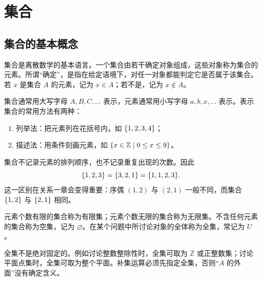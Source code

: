 %
%

\chapter{集合}

\section{集合的基本概念}

集合是离散数学的基本语言。一个集合由若干确定对象组成，这些对象称为集合的元素。所谓“确定”，是指在给定语境下，对任一对象都能判定它是否属于该集合。若 $x$ 是集合 $A$ 的元素，记为 $x\in A$；若不是，记为 $x\notin A$。

\begin{definition}[集合、元素与表示法]\label{ch1-set-basic}
集合通常用大写字母 $A,B,C,\ldots$ 表示，元素通常用小写字母 $a,b,x,\ldots$ 表示。表示集合的常用方法有两种：
\begin{enumerate}
  \item 列举法：把元素列在花括号内，如 $\{1,2,3,4\}$；
  \item 描述法：用条件刻画元素，如 $\{x\in\mathbb Z\mid 0\le x\le 9\}$。
\end{enumerate}
\end{definition}

集合不记录元素的排列顺序，也不记录重复出现的次数。因此
\[
  \{1,2,3\}=\{3,2,1\}=\{1,1,2,3\}.
\]
这一区别在关系一章会变得重要：序偶 $(1,2)$ 与 $(2,1)$ 一般不同，而集合 $\{1,2\}$ 与 $\{2,1\}$ 相同。

\begin{definition}\label{ch1-empty-universe}
元素个数有限的集合称为有限集；元素个数无限的集合称为无限集。不含任何元素的集合称为空集，记为 $\varnothing$。在某个问题中所讨论对象的全体称为全集，常记为 $U$。
\end{definition}

全集不是绝对固定的。例如讨论整数整除性时，全集可取为 $\mathbb Z$ 或正整数集；讨论平面点集时，全集可取为整个平面。补集运算必须先指定全集，否则“$A$ 的外面”没有确定含义。

